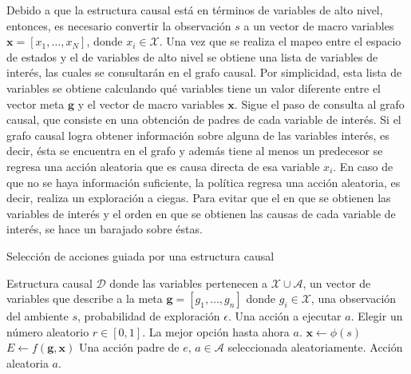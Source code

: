 Debido a que la estructura causal está en términos de variables de alto nivel,
entonces, es necesario convertir la observación $s$ a un vector de macro variables $\mathbf{x} = [x_1, \dots, x_N]$, donde $x_i \in \mathcal{X}$. 
Una vez que se
realiza el mapeo entre el espacio de
estados y el de variables de alto nivel se obtiene una lista de variables
de interés, las cuales se consultarán en el grafo causal.
Por simplicidad, esta lista de variables se obtiene calculando
qué variables tiene un valor diferente entre el vector meta $\mathbf{g}$
y el vector de macro variables $\mathbf{x}$.
Sigue el paso de consulta al grafo causal, que consiste en una
obtención de padres de cada variable de interés. Si el grafo causal
logra obtener información sobre alguna de las variables interés, es decir,
ésta se encuentra en el grafo y además tiene al menos un predecesor
se regresa una acción aleatoria que es causa directa de esa variable $x_i$.
En caso de que no se haya información suficiente, la política regresa una acción aleatoria,
es decir, realiza un exploración a ciegas. Para evitar que el  en que
se obtienen las variables de interés y el orden en que se obtienen las causas de 
cada variable de interés, se hace un barajado sobre éstas.

\begin{algorithm}[H]
  \caption{Selección de acciones guiada por una estructura causal \label{alg:guided-action-selection}}
  \begin{algorithmic}[1]
  \REQUIRE Estructura causal $\mathcal{D}$ donde las variables pertenecen a $\mathcal{X} \cup \mathcal{A}$, un vector de variables
  que describe a la meta $\mathbf{g} = [g_1, \dots, g_n]$ donde $g_i \in \mathcal{X}$, una observación del ambiente $s$, probabilidad de exploración $\epsilon$.
  \ENSURE Una acción a ejecutar $a$.
  \STATE Elegir un número aleatorio $r \in [0, 1]$.
    \RETURN La mejor opción hasta ahora $a$.
   \ENDIF
  \STATE $\mathbf{x} \leftarrow \phi(s)$ 
   \STATE $E \leftarrow f(\mathbf{g}, \mathbf{x})$ 
        \RETURN Una acción padre de $e$, $a \in \mathcal{A}$ seleccionada aleatoriamente.
    \ENDIF
    \ENDFOR
    \RETURN Acción aleatoria $a$.
  \end{algorithmic}
\end{algorithm}


